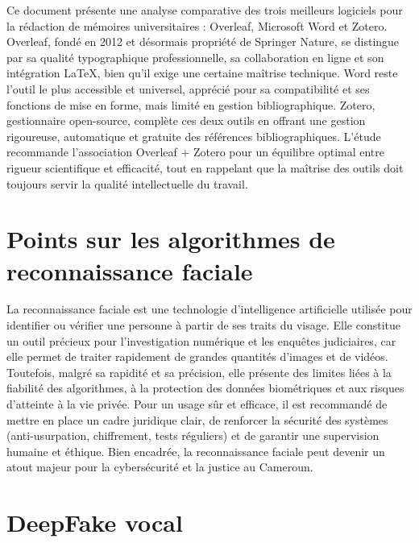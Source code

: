 \documentclass[memoire, 12pt]{report}
\begin{document}
Ce document présente une analyse comparative des trois meilleurs logiciels pour la rédaction de mémoires universitaires : Overleaf, Microsoft Word et Zotero. Overleaf, fondé en 2012 et désormais propriété de Springer Nature, se distingue par sa qualité typographique professionnelle, sa collaboration en ligne et son intégration LaTeX, bien qu’il exige une certaine maîtrise technique. Word reste l’outil le plus accessible et universel, apprécié pour sa compatibilité et ses fonctions de mise en forme, mais limité en gestion bibliographique. Zotero, gestionnaire open-source, complète ces deux outils en offrant une gestion rigoureuse, automatique et gratuite des références bibliographiques. L’étude recommande l’association Overleaf + Zotero pour un équilibre optimal entre rigueur scientifique et efficacité, tout en rappelant que la maîtrise des outils doit toujours servir la qualité intellectuelle du travail.


\section{Points sur les algorithmes de reconnaissance
faciale}

La reconnaissance faciale est une technologie d’intelligence artificielle utilisée pour identifier ou vérifier une personne à partir de ses traits du visage. Elle constitue un outil précieux pour l’investigation numérique et les enquêtes judiciaires, car elle permet de traiter rapidement de grandes quantités d’images et de vidéos. Toutefois, malgré sa rapidité et sa précision, elle présente des limites liées à la fiabilité des algorithmes, à la protection des données biométriques et aux risques d’atteinte à la vie privée. Pour un usage sûr et efficace, il est recommandé de mettre en place un cadre juridique clair, de renforcer la sécurité des systèmes (anti-usurpation, chiffrement, tests réguliers) et de garantir une supervision humaine et éthique. Bien encadrée, la reconnaissance faciale peut devenir un atout majeur pour la cybersécurité et la justice au Cameroun.



\section{DeepFake vocal}
\end{document}
